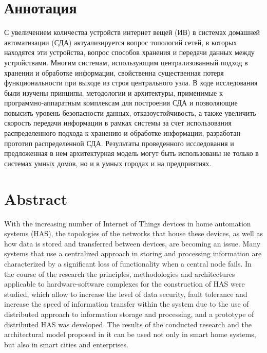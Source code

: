 \documentclass[14pt,a4paper]{extarticle}
\begin{document}

%



\section*{Аннотация}

С увеличением количества устройств интернет вещей (ИВ) в системах домашней автоматизации (СДА) актуализируется вопрос топологий сетей, в которых находятся эти устройства, вопрос 
способов хранения и передачи данных между устройствами. Многим системам, использующим централизованный подход в хранении и обработке информации, свойственна существенная потеря
функциональности при выходе из строя центрального узла. В ходе исследования были изучены принципы, методологии и архитектуры, применимые к программно-аппаратным комплексам для
построения СДА и позволяющие повысить уровень безопасности данных, отказоустойчивость, а также увеличить скорость передачи информации в рамках системы за счет использования
распределенного подхода к хранению и обработке информации, разработан прототип распределенной СДА. Результаты проведенного исследования и предложенная в нем архитектурная модель
могут быть использованы не только в системах умных домов, но и в умных городах и на предприятиях.

\section*{Abstract}

With the increasing number of Internet of Things devices in home automation systems (HAS), the topologies of the networks that house these devices, as well as how data is stored
and transferred between devices, are becoming an issue. Many systems that use a centralized approach in storing and processing information are characterized by a significant loss of
functionality when a central node fails. In the course of the research the principles, methodologies and architectures applicable to hardware-software complexes for the construction
of HAS were studied, which allow to increase the level of data security, fault tolerance and increase the speed of information transfer within the system due to the use of distributed
approach to information storage and processing, and a prototype of distributed HAS was developed. The results of the conducted research and the architectural model proposed in it can
be used not only in smart home systems, but also in smart cities and enterprises.
\end{document}
